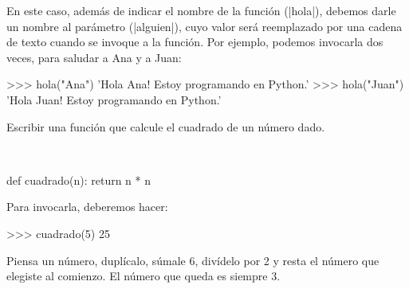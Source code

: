 En este caso, además de indicar el nombre de la función (|hola|), debemos darle
un nombre al parámetro (|alguien|), cuyo valor será reemplazado por una cadena
de texto cuando se invoque a la función. Por ejemplo, podemos invocarla dos
veces, para saludar a Ana y a Juan:

\begin{codigo-python-sn}
>>> hola("Ana")
'Hola Ana! Estoy programando en Python.'
>>> hola("Juan")
'Hola Juan! Estoy programando en Python.'
\end{codigo-python-sn}

\begin{problema}
\label{cuadrado}
Escribir una función que calcule el cuadrado de un número dado.
\end{problema}

\begin{solucion}
$ $\par
\begin{codigo-python-sn}
def cuadrado(n):
    return n * n
\end{codigo-python-sn}

Para invocarla, deberemos hacer:
\begin{codigo-python-sn}
>>> cuadrado(5)
25
\end{codigo-python-sn}
\end{solucion}

\begin{problema}
Piensa un número, duplícalo, súmale 6, divídelo por 2 y resta el número
que elegiste al comienzo. El número que queda es siempre 3.
\end{problema}

